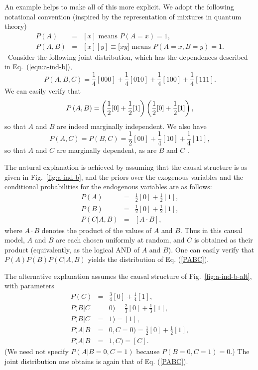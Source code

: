 \documentclass[letterpaper,onecolumn,nofootinbib]{revtex4}
\begin{document}
An example helps to make all of this more explicit.  
We adopt the following notational convention (inspired by the representation
of mixtures in quantum theory)
\begin{eqnarray*}
P(A) &=&[x] \text{ means }P\left( A=x\right) =1, \\
P(A,B) &=&[x][y]\equiv \lbrack xy]\text{ means } P\left( A=x,B=y\right) =1.
\end{eqnarray*}%
\ Consider the following joint distribution, which has the dependences
described in Eq.~(\ref{eqn:a-ind-b}),
\begin{equation}
P(A,B,C)=\frac{1}{4}[000]+\frac{1}{4}[010]+\frac{1}{4}[100]+\frac{1}{4}[111].
\label{PABC}
\end{equation}
We can easily verify that
\begin{equation*}
P\left( A,B\right) =\left( \frac{1}{2}[0]+\frac{1}{2}[1]\right) \left( \frac{%
1}{2}[0]+\frac{1}{2}[1]\right) ,
\end{equation*}%
so that $A$ and $B$ are indeed marginally independent.  We also have
\begin{equation*}
P(A,C)=P(B,C)=\frac{1}{2}[00]+\frac{1}{4}[10]+\frac{1}{4}[11],
\end{equation*}%
so that $A$ and $C$ are marginally dependent, as are $B$ and $C$ .

The natural explanation is achieved by assuming that the causal structure is as given in Fig.~\ref{fig:a-ind-b}, and the priors over the exogenous variables and the conditional
probabilities for the endogenous variables are as follows:%
\begin{eqnarray*}
P(A) &=&\frac{1}{2}[0]+\frac{1}{2}[1], \\
P(B) &=&\frac{1}{2}[0]+\frac{1}{2}[1], \\
P(C|A,B) &=&\left[ A\cdot B\right] ,
\end{eqnarray*}%
where $A\cdot B$ denotes the product of the values of $A$ and $B.$ Thus in this
causal model, $A$ and $B$ are each chosen uniformly at random, and $C$ is
obtained as their product (equivalently, as the logical AND of $A$ and $B$).
 One can easily verify that $P(A)P(B)P(C|A,B)$ yields the distribution of
Eq. (\ref{PABC}).

The alternative explanation assumes the causal structure of Fig.~\ref{fig:a-ind-b-alt}, with
parameters
\begin{eqnarray*}
P(C) &=&\frac{3}{4}[0]+\frac{1}{4}[1], \\
P(B|C &=&0)=\frac{2}{3}[0]+\frac{1}{3}[1], \\
P(B|C &=&1)=[1], \\
P(A|B &=&0,C=0)=\frac{1}{2}[0]+\frac{1}{2}[1], \\
P(A|B &=&1,C)=[C].
\end{eqnarray*}%
(We need not specify $P(A| B=0, C=1)$ because $P(B=0, C=1)=0$.)  The joint distribution one obtains is again that of Eq. (\ref{PABC}).
\end{document}
